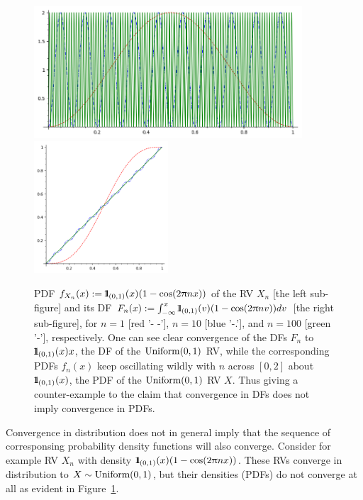 \begin{figure}[htbp]
\begin{center}
\includegraphics[width=10cm]{figures/PDFOf1minusCos2PinxOn01OscillatesIndefinitely.png}
\includegraphics[width=5cm]{figures/DFOf1minusCos2PinxOn01To1ApproachesDFOfUniform01.png}
\caption{PDF $f_{X_n}(x) := {1}\mspace{-11 mu}{1}_{(0,1)}(x)(1-\cos(2\uppi n x))$ of the RV $X_n$ [the left sub-figure] and its DF $F_n(x) := \int_{-\infty}^x{1}\mspace{-11 mu}{1}_{(0,1)}(v)(1-\cos(2\uppi n v))dv$ [the right sub-figure], for $n =1$ [red '- -'], $n=10$ [blue '-.'], and $n=100$ [green '-'], respectively. One can see clear convergence of the DFs $F_n$ to ${1}\mspace{-11 mu}{1}_{(0,1)}(x)x$, the DF of the $\mbox{{\rm Uniform}}(0,1)$ RV, while the corresponding PDFs $f_n(x)$ keep oscillating wildly with $n$ across $[0,2]$ about ${1}\mspace{-11 mu}{1}_{(0,1)}(x)$, the PDF of the $\mbox{{\rm Uniform}}(0,1)$ RV $X$. Thus giving a counter-example to the claim that convergence in DFs does not imply convergence in PDFs.\label{F:ScheffesThmCounterExample}}
\end{center}
\end{figure}
Convergence in distribution does not in general imply that the sequence of corresponsing probability density functions will also converge. 
Consider for example RV $X_n$ with density ${1}\mspace{-11 mu}{1}_{(0,1)}(x)(1-\cos(2\uppi n x))$. 
These RVs converge in distribution to $X \sim \mbox{{\rm Uniform}}(0,1)$, but their densities (PDFs) do not converge at all as evident in Figure~\ref{F:ScheffesThmCounterExample}. 

